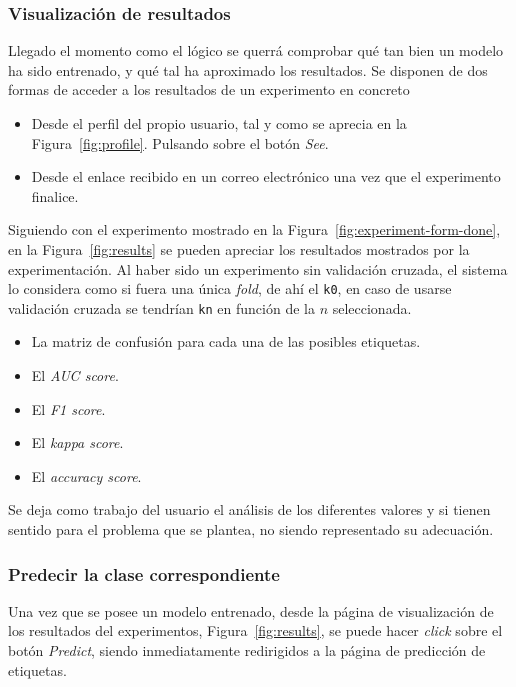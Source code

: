 \subsubsection{Visualización de resultados}
Llegado el momento como el lógico se querrá comprobar qué tan bien un modelo ha sido entrenado, y qué tal ha aproximado los resultados. Se disponen de dos formas de acceder a los resultados de un experimento en concreto

\begin{itemize}
\item Desde el perfil del propio usuario, tal y como se aprecia en la Figura~\ref{fig:profile}. Pulsando sobre el botón \textit{See}.
\item Desde el enlace recibido en un correo electrónico una vez que el experimento finalice.
\end{itemize}


Siguiendo con el experimento mostrado en la Figura~\ref{fig:experiment-form-done}, en la Figura~\ref{fig:results} se pueden apreciar los resultados mostrados por la experimentación. Al haber sido un experimento sin validación cruzada, el sistema lo considera como si fuera una única \textit{fold}, de ahí el \texttt{k0}, en caso de usarse validación cruzada se tendrían \texttt{kn} en función de la $n$ seleccionada.

\begin{itemize}
\item La matriz de confusión para cada una de las posibles etiquetas.
\item El \textit{AUC score}.
\item El \textit{F1 score}.
\item El \textit{kappa score}.
\item El \textit{accuracy score}.
\end{itemize}

Se deja como trabajo del usuario el análisis de los diferentes valores y si tienen sentido para el problema que se plantea, no siendo representado su adecuación.


\subsubsection{Predecir la clase correspondiente}
Una vez que se posee un modelo entrenado, desde la página de visualización de los resultados del experimentos, Figura~\ref{fig:results}, se puede hacer \textit{click} sobre el botón \textit{Predict}, siendo inmediatamente redirigidos a la página de predicción de etiquetas.

